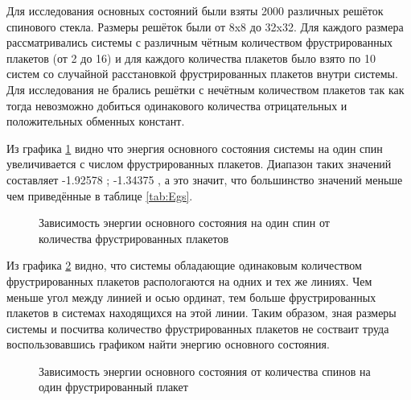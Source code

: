 \documentclass[utf8, babel, sor, jor, amsmath, amssymb, reprint]{elsarticle} %
\begin{document}
Для исследования основных состояний были взяты 2000 различных решёток спинового стекла.
Размеры решёток были от 8x8 до 32x32. Для каждого размера рассматривались системы с различным чётным количеством фрустрированных плакетов (от 2 до 16) и для каждого количества плакетов было взято по 10 систем со случайной расстановкой фрустрированных плакетов внутри системы. Для исследования не  брались решётки с нечётным количеством плакетов так как тогда невозможно добиться одинакового количества отрицательных и положительных обменных констант. 

Из графика \ref{fig:Egs_N_F} видно что энергия основного состояния системы на один спин увеличивается с числом фрустрированных плакетов. Диапазон таких значений составляет -1.92578 ; -1.34375 , а это значит, что большинство значений меньше чем приведённые в таблице \ref{tab:Egs}. 

\begin{figure}[H]
	\centering
	\caption{Зависимость энергии основного состояния на один спин от количества фрустрированных плакетов}
	\label{fig:Egs_N_F}
\end{figure}

Из графика \ref{fig:Egs____N_F} видно, что системы обладающие одинаковым количеством фрустрированных плакетов распологаются на одних и тех же линиях. Чем меньше угол между линией и осью ординат, тем больше фрустрированных плакетов в системах находящихся на этой линии. Таким образом, зная размеры системы и посчитва количество фрустрированных плакетов не состваит труда воспользовавшись графиком найти энергию основного состояния.

\begin{figure}[H]
	\centering
	\caption{Зависимость энергии основного состояния от количества спинов на один фрустрированный плакет}
	\label{fig:Egs____N_F}
\end{figure}
\end{document}
